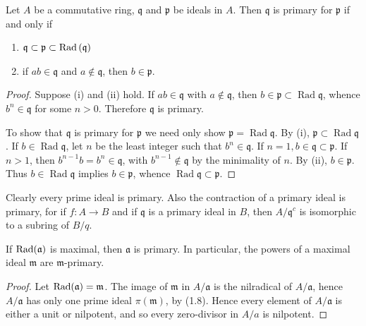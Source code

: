 \begin{theorem}
    \label{thm: Equivalent condition about associated prime ideal of primary ideals}
    Let $A$ be a commutative ring, $\mathfrak{q}$ and $\mathfrak{p}$ be ideals in $A$.
    Then $\mathfrak{q}$ is primary for $\mathfrak{p}$ if and only if
    \begin{enumerate}[label=(\roman*)]
        \item
              $\mathfrak{q} \subset \mathfrak{p}\subset \operatorname{\operatorname{Rad}} \left(\mathfrak{q}\right)$
        \item
              if $ab \in \mathfrak{q}$ and $a \notin \mathfrak{q}$, then $b \in \mathfrak{p}$.
    \end{enumerate}
    \begin{proof}
        Suppose (i) and (ii) hold.
        If $a b \in \mathfrak{q}$ with $a \not\in \mathfrak{q}$, then $b \in \mathfrak{p} \subset \operatorname{Rad} \mathfrak{q}$, whence $b^n \in \mathfrak{q}$ for some $n>0$. Therefore $\mathfrak{q}$ is primary.

        To show that $\mathfrak{q}$ is primary for $\mathfrak{p}$ we need only show $\mathfrak{p}=\operatorname{Rad} \mathfrak{q}$.
        By (i), $\mathfrak{p} \subset \operatorname{Rad} \mathfrak{q}$. If $b \in \operatorname{Rad} \mathfrak{q}$, let $n$ be the least integer such that $b^n \in \mathfrak{q}$. If $n=1, b \in \mathfrak{q} \subset \mathfrak{p}$. If $n>1$, then $b^{n-1} b=b^n \in \mathfrak{q}$, with $b^{n-1} \notin \mathfrak{q}$ by the minimality of $n$.
        By (ii), $b \in \mathfrak{p}$. Thus $b \in \operatorname{Rad} \mathfrak{q}$ implies $b \in \mathfrak{p}$, whence $\operatorname{Rad} \mathfrak{q} \subset \mathfrak{p}$.
    \end{proof}
\end{theorem}





\begin{proposition}
    Clearly every prime ideal is primary. Also the contraction of a primary ideal is primary, for if $f: A \rightarrow B$ and if $\mathfrak{q}$ is a primary ideal in $B$, then $A / \mathfrak{q}^c$ is isomorphic to a subring of $B / q$.
\end{proposition}



\begin{proposition}
    If $\operatorname{\operatorname{Rad}}(\mathfrak{a})$ is maximal, then $\mathfrak{a}$ is primary. In particular, the powers of a maximal ideal $\mathfrak{m}$ are $\mathfrak{m}$-primary.
    \begin{proof}
        Let $\operatorname{\operatorname{Rad}}(\mathfrak{a})=\mathfrak{m}$. The image of $\mathfrak{m}$ in $A / \mathfrak{a}$ is the nilradical of $A / \mathfrak{a}$, hence $A / \mathfrak{a}$ has only one prime ideal $\pi(\mathfrak{m})$, by (1.8). Hence every element of $A / \mathfrak{a}$ is either a unit or nilpotent, and so every zero-divisor in $A / a$ is nilpotent.
    \end{proof}
\end{proposition}


